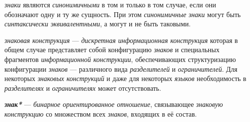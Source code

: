 \begin{SCn}


\end{SCn}

\textit{знаки} являются \textit{синонимичными} в том и только в том случае, если они обозначают одну и ту же сущность.
При этом \textit{синонимичные знаки} могут быть \textit{синтаксически эквивалентными}, а могут и не быть таковыми.

\begin{SCn}


\end{SCn}

\textit{знаковая конструкция} --- \textit{дискретная информационная конструкция} которая в общем случае представляет собой конфигурацию \textit{знаков} и специальных фрагментов \textit{информационной конструкции}, обеспечивающих структуризацию конфигурации \textit{знаков} --- различного вида \textit{разделителей} и \textit{ограничителей}.
Для некоторых \textit{знаковых конструкций} и даже для некоторых \textit{языков} необходимость в \textit{разделителях} и \textit{ограничителях} может отсутствовать.

\begin{SCn}

        \begin{scnindent}
        \end{scnindent}

\end{SCn}

\textit{\textbf{знак*}} --- \textit{бинарное ориентированное отношение}, связывающее \textit{знаковую конструкцию} со множеством всех \textit{знаков}, входящих в её состав.

